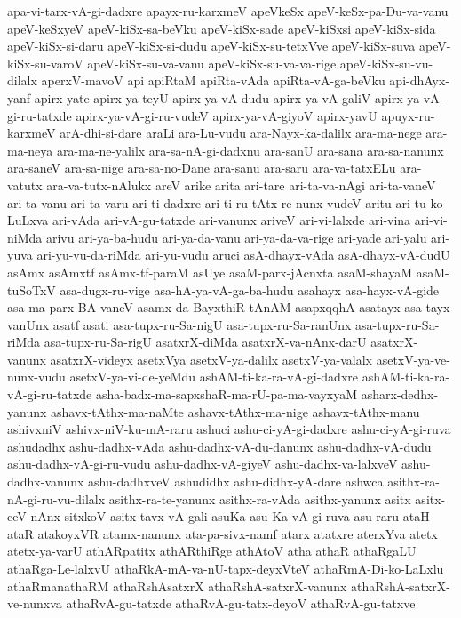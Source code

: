 {apa-vi-tarx-vA-gi-dadxre
apayx-ru-karxmeV
apeVkeSx
apeV-keSx-pa-Du-va-vanu
apeV-keSxyeV
apeV-kiSx-sa-beVku
apeV-kiSx-sade
apeV-kiSxsi
apeV-kiSx-sida
apeV-kiSx-si-daru
apeV-kiSx-si-dudu
apeV-kiSx-su-tetxVve
apeV-kiSx-suva
apeV-kiSx-su-varoV
apeV-kiSx-su-va-vanu
apeV-kiSx-su-va-va-rige
apeV-kiSx-su-vu-dilalx
aperxV-mavoV
api
apiRtaM
apiRta-vAda
apiRta-vA-ga-beVku
api-dhAyx-yanf
apirx-yate
apirx-ya-teyU
apirx-ya-vA-dudu
apirx-ya-vA-galiV
apirx-ya-vA-gi-ru-tatxde
apirx-ya-vA-gi-ru-vudeV
apirx-ya-vA-giyoV
apirx-yavU
apuyx-ru-karxmeV
arA-dhi-si-dare
araLi
ara-Lu-vudu
ara-Nayx-ka-dalilx
ara-ma-nege
ara-ma-neya
ara-ma-ne-yalilx
ara-sa-nA-gi-dadxnu
ara-sanU
ara-sana
ara-sa-nanunx
ara-saneV
ara-sa-nige
ara-sa-no-Dane
ara-sanu
ara-saru
ara-va-tatxELu
ara-vatutx
ara-va-tutx-nAlukx
areV
arike
arita
ari-tare
ari-ta-va-nAgi
ari-ta-vaneV
ari-ta-vanu
ari-ta-varu
ari-ti-dadxre
ari-ti-ru-tAtx-re-nunx-vudeV
aritu
ari-tu-ko-LuLxva
ari-vAda
ari-vA-gu-tatxde
ari-vanunx
ariveV
ari-vi-lalxde
ari-vina
ari-vi-niMda
arivu
ari-ya-ba-hudu
ari-ya-da-vanu
ari-ya-da-va-rige
ari-yade
ari-yalu
ari-yuva
ari-yu-vu-da-riMda
ari-yu-vudu
aruci
asA-dhayx-vAda
asA-dhayx-vA-dudU
asAmx
asAmxtf
asAmx-tf-paraM
asUye
asaM-parx-jAcnxta
asaM-shayaM
asaM-tuSoTxV
asa-dugx-ru-vige
asa-hA-ya-vA-ga-ba-hudu
asahayx
asa-hayx-vA-gide
asa-ma-parx-BA-vaneV
asamx-da-BayxthiR-tAnAM
asapxqqhA
asatayx
asa-tayx-vanUnx
asatf
asati
asa-tupx-ru-Sa-nigU
asa-tupx-ru-Sa-ranUnx
asa-tupx-ru-Sa-riMda
asa-tupx-ru-Sa-rigU
asatxrX-diMda
asatxrX-va-nAnx-darU
asatxrX-vanunx
asatxrX-videyx
asetxVya
asetxV-ya-dalilx
asetxV-ya-valalx
asetxV-ya-ve-nunx-vudu
asetxV-ya-vi-de-yeMdu
ashAM-ti-ka-ra-vA-gi-dadxre
ashAM-ti-ka-ra-vA-gi-ru-tatxde
asha-badx-ma-sapxshaR-ma-rU-pa-ma-vayxyaM
asharx-dedhx-yanunx
ashavx-tAthx-ma-naMte
ashavx-tAthx-ma-nige
ashavx-tAthx-manu
ashivxniV
ashivx-niV-ku-mA-raru
ashuci
ashu-ci-yA-gi-dadxre
ashu-ci-yA-gi-ruva
ashudadhx
ashu-dadhx-vAda
ashu-dadhx-vA-du-danunx
ashu-dadhx-vA-dudu
ashu-dadhx-vA-gi-ru-vudu
ashu-dadhx-vA-giyeV
ashu-dadhx-va-lalxveV
ashu-dadhx-vanunx
ashu-dadhxveV
ashudidhx
ashu-didhx-yA-dare
ashwca
asithx-ra-nA-gi-ru-vu-dilalx
asithx-ra-te-yanunx
asithx-ra-vAda
asithx-yanunx
asitx
asitx-ceV-nAnx-sitxkoV
asitx-tavx-vA-gali
asuKa
asu-Ka-vA-gi-ruva
asu-raru
ataH
ataR
atakoyxVR
atamx-nanunx
ata-pa-sivx-namf
atarx
atatxre
aterxYva
atetx
atetx-ya-varU
athARpatitx
athARthiRge
athAtoV
atha
athaR
athaRgaLU
athaRga-Le-lalxvU
athaRkA-mA-va-nU-tapx-deyxVteV
athaRmA-Di-ko-LaLxlu
athaRmanathaRM
athaRshAsatxrX
athaRshA-satxrX-vanunx
athaRshA-satxrX-ve-nunxva
athaRvA-gu-tatxde
athaRvA-gu-tatx-deyoV
athaRvA-gu-tatxve
}
